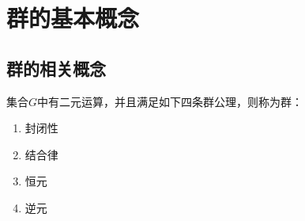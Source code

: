 \chapter{群的基本概念}
\section{群的相关概念}
\begin{theorem}[群]
    集合$G$中有二元运算，并且满足如下四条群公理，则称为群：
    \begin{enumerate}
        \item 封闭性
        \item 结合律
        \item 恒元
        \item 逆元
    \end{enumerate}
\end{theorem}